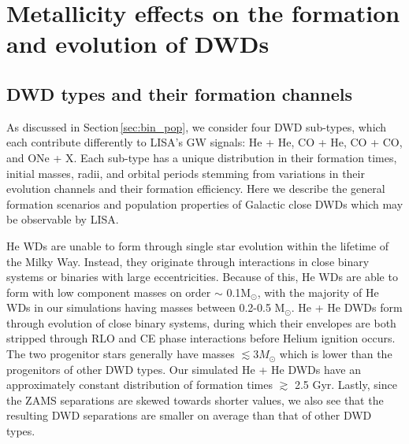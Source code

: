\documentclass[twocolumn]{aastex631}
\newcommand{\cosmic}{\texttt{COSMIC}}
\begin{document}
\section{Metallicity effects on the formation and evolution of DWDs}\label{sec:results}

\subsection{DWD types and their formation channels}\label{sec:ini}
As discussed in Section\,\ref{sec:bin_pop}, we consider four DWD sub-types, which each contribute differently to LISA's GW signals: He + He, CO + He, CO + CO, and ONe + X. Each sub-type has a unique distribution in their formation times, initial masses, radii, and orbital periods stemming from variations in their evolution channels and their formation efficiency. Here we describe the general formation scenarios and population properties of Galactic close DWDs which may be observable by LISA.



He WDs are unable to form through single star evolution within the lifetime of the Milky Way. Instead, they originate through interactions in close binary systems or binaries with large eccentricities. Because of this, He WDs are able to form with low component masses on order $\sim$ 0.1M$_\odot$, with the majority of He WDs in our simulations having masses between 0.2-0.5 M$_\odot$. 
He + He DWDs form through evolution of close binary systems, during which their envelopes are both stripped through RLO and CE phase interactions before Helium ignition occurs. The two progenitor stars generally have masses $\lesssim 3 M_\odot$ which is lower than the progenitors of other DWD types. Our simulated He + He DWDs have an approximately constant distribution of formation times $\gtrsim$ 2.5 Gyr. Lastly, since the ZAMS separations are skewed towards shorter values, we also see that the resulting DWD separations are smaller on average than that of other DWD types. 
\end{document}
